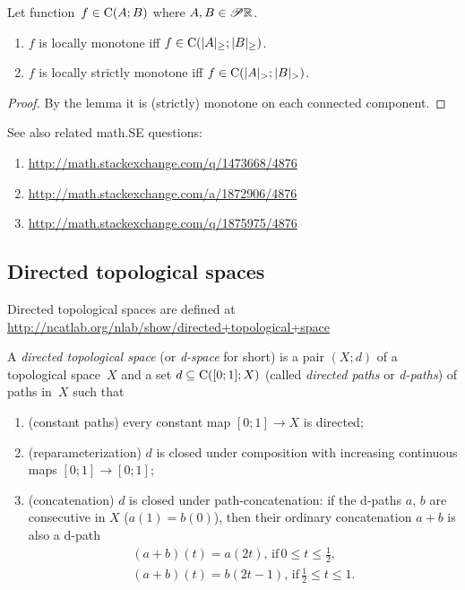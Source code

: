 \begin{thm}
Let function~$f\in\mathrm{C}(A;B)$ where $A,B\in\mathscr{P}\mathbb{R}$.
\begin{enumerate}
\item $f$ is locally monotone iff $f\in\mathrm{C}(|A|_{\geq};|B|_{\geq})$.
\item $f$ is locally strictly monotone iff $f\in\mathrm{C}(|A|_{>};|B|_{>})$.
\end{enumerate}
\end{thm}

\begin{proof}
By the lemma it is (strictly) monotone on each connected component.
\end{proof}

See also related math.SE questions:
\begin{enumerate}
\item \url{http://math.stackexchange.com/q/1473668/4876}
\item \url{http://math.stackexchange.com/a/1872906/4876}
\item \url{http://math.stackexchange.com/q/1875975/4876}
\end{enumerate}

\subsection{Directed topological spaces}

Directed topological spaces are defined at\\
\url{http://ncatlab.org/nlab/show/directed+topological+space}

\begin{defn}
A \emph{directed topological space} (or \emph{d-space} for short) is a pair $(X;d)$ of a topological space~$X$ and
a set $d\subseteq\mathrm{C}([0;1];X)$ (called \emph{directed paths} or \emph{d-paths}) of paths in~$X$ such that
\begin{enumerate}
\item (constant paths) every constant map $[0;1]\to X$ is directed;
\item (reparameterization) $d$ is closed under composition with increasing continuous maps $[0;1]\to [0;1]$;
\item (concatenation) $d$ is closed under path-concatenation: if the d-paths $a$, $b$ are consecutive in $X$ ($a(1)=b(0)$), then their ordinary concatenation $a+b$ is also a d-path
\begin{gather*}
(a+b)(t) = a(2t),\,\text{if}\, 0\le t\le \frac{1}{2}, \\
(a+b)(t) = b(2t-1),\,\text{if}\, \frac{1}{2}\le t\le 1.
\end{gather*}
\end{enumerate}
\end{defn}

